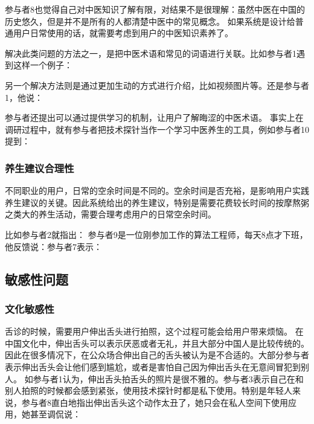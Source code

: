 参与者8也觉得自己对中医知识了解有限，对结果不是很理解：虽然中医在中国的历史悠久，但是并不是所有的人都清楚中医中的常见概念。 如果系统是设计给普通用户日常使用的话，就需要考虑到用户的中医知识素养了。

解决此类问题的方法之一，是把中医术语和常见的词语进行关联。比如参与者1遇到这样一个例子：

另一个解决方法则是通过更加生动的方式进行介绍，比如视频图片等。还是参与者1，他说：

参与者还提出可以通过提供学习的机制，让用户了解晦涩的中医术语。
事实上在调研过程中，就有参与者把技术探针当作一个学习中医养生的工具，例如参与者10提到：

\subsubsection{养生建议合理性}

不同职业的用户，日常的空余时间是不同的。空余时间是否充裕，是影响用户实践养生建议的关键。因此系统给出的养生建议，特别是需要花费较长时间的按摩熬粥之类大的养生活动，需要合理考虑用户的日常空余时间。

比如参与者2就指出：
参与者9是一位刚参加工作的算法工程师，每天8点才下班，他反馈说：参与者7表示：

\subsection{敏感性问题}

\subsubsection{文化敏感性}


舌诊的时候，需要用户伸出舌头进行拍照，这个过程可能会给用户带来烦恼。
在中国文化中，伸出舌头可以表示厌恶或者无礼，并且大部分中国人是比较传统的。因此在很多情况下，在公众场合伸出自己的舌头被认为是不合适的。大部分参与者表示伸出舌头会让他们感到尴尬，或者是害怕自己因为伸出舌头在无意间冒犯到别人。
如参与者1认为，伸出舌头拍舌头的照片是很不雅的。参与者3表示自己在和别人拍照的时候都会感到紧张，使用技术探针时都是私下使用。特别是年轻人来说，参与者8直白地指出伸出舌头这个动作太丑了，她只会在私人空间下使用应用，她甚至调侃说：

